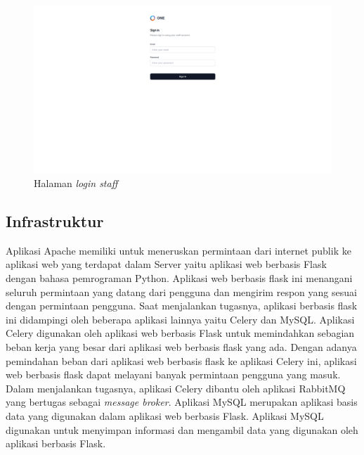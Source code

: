 \documentclass[
	a4paper, %
	10pt, %
	unnumberedsections, %
	twoside, %
]{LTJournalArticle}
\begin{document}
\begin{figure}[H]
\includegraphics[width=\linewidth]{view_staff_login.png}
\caption{Halaman \textit{login staff}}
\label{gambar:staff_login}
\end{figure}

\subsection{Infrastruktur}
Aplikasi Apache memiliki untuk meneruskan permintaan dari internet publik ke aplikasi web yang terdapat dalam Server yaitu aplikasi web berbasis Flask dengan bahasa pemrograman Python. Aplikasi web berbasis flask ini menangani seluruh permintaan yang datang dari pengguna dan mengirim respon yang sesuai dengan permintaan pengguna. Saat menjalankan tugasnya, aplikasi berbasis flask ini didampingi oleh beberapa aplikasi lainnya yaitu Celery dan MySQL. Aplikasi Celery digunakan oleh aplikasi web berbasis Flask untuk memindahkan sebagian beban kerja yang besar dari aplikasi web berbasis flask yang ada. Dengan adanya pemindahan beban dari aplikasi web berbasis flask ke aplikasi Celery ini, aplikasi web berbasis flask dapat melayani banyak permintaan pengguna yang masuk. Dalam menjalankan tugasnya, aplikasi Celery dibantu oleh aplikasi RabbitMQ yang bertugas sebagai \textit{message broker}. Aplikasi MySQL merupakan aplikasi basis data yang digunakan dalam aplikasi web berbasis Flask. Aplikasi MySQL digunakan untuk menyimpan informasi dan mengambil data yang digunakan oleh aplikasi berbasis Flask.
\end{document}

